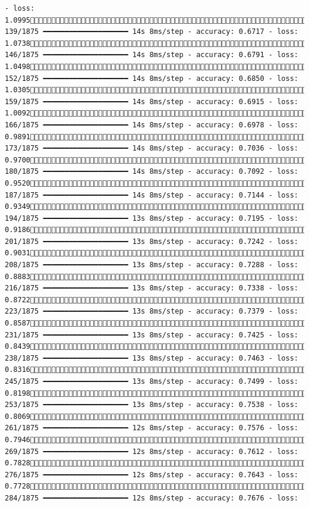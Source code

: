 \documentclass[
  letterpaper,
  DIV=11,
  numbers=noendperiod]{scrreprt}
\begin{document}
\begin{verbatim}
- loss: 1.0995 139/1875 ━━━━━━━━━━━━━━━━━━━━ 14s 8ms/step - accuracy: 0.6717 - loss: 1.0738 146/1875 ━━━━━━━━━━━━━━━━━━━━ 14s 8ms/step - accuracy: 0.6791 - loss: 1.0498 152/1875 ━━━━━━━━━━━━━━━━━━━━ 14s 8ms/step - accuracy: 0.6850 - loss: 1.0305 159/1875 ━━━━━━━━━━━━━━━━━━━━ 14s 8ms/step - accuracy: 0.6915 - loss: 1.0092 166/1875 ━━━━━━━━━━━━━━━━━━━━ 14s 8ms/step - accuracy: 0.6978 - loss: 0.9891 173/1875 ━━━━━━━━━━━━━━━━━━━━ 14s 8ms/step - accuracy: 0.7036 - loss: 0.9700 180/1875 ━━━━━━━━━━━━━━━━━━━━ 14s 8ms/step - accuracy: 0.7092 - loss: 0.9520 187/1875 ━━━━━━━━━━━━━━━━━━━━ 14s 8ms/step - accuracy: 0.7144 - loss: 0.9349 194/1875 ━━━━━━━━━━━━━━━━━━━━ 13s 8ms/step - accuracy: 0.7195 - loss: 0.9186 201/1875 ━━━━━━━━━━━━━━━━━━━━ 13s 8ms/step - accuracy: 0.7242 - loss: 0.9031 208/1875 ━━━━━━━━━━━━━━━━━━━━ 13s 8ms/step - accuracy: 0.7288 - loss: 0.8883 216/1875 ━━━━━━━━━━━━━━━━━━━━ 13s 8ms/step - accuracy: 0.7338 - loss: 0.8722 223/1875 ━━━━━━━━━━━━━━━━━━━━ 13s 8ms/step - accuracy: 0.7379 - loss: 0.8587 231/1875 ━━━━━━━━━━━━━━━━━━━━ 13s 8ms/step - accuracy: 0.7425 - loss: 0.8439 238/1875 ━━━━━━━━━━━━━━━━━━━━ 13s 8ms/step - accuracy: 0.7463 - loss: 0.8316 245/1875 ━━━━━━━━━━━━━━━━━━━━ 13s 8ms/step - accuracy: 0.7499 - loss: 0.8198 253/1875 ━━━━━━━━━━━━━━━━━━━━ 13s 8ms/step - accuracy: 0.7538 - loss: 0.8069 261/1875 ━━━━━━━━━━━━━━━━━━━━ 12s 8ms/step - accuracy: 0.7576 - loss: 0.7946 269/1875 ━━━━━━━━━━━━━━━━━━━━ 12s 8ms/step - accuracy: 0.7612 - loss: 0.7828 276/1875 ━━━━━━━━━━━━━━━━━━━━ 12s 8ms/step - accuracy: 0.7643 - loss: 0.7728 284/1875 ━━━━━━━━━━━━━━━━━━━━ 12s 8ms/step - accuracy: 0.7676 - loss: 
\end{verbatim}
\end{document}
